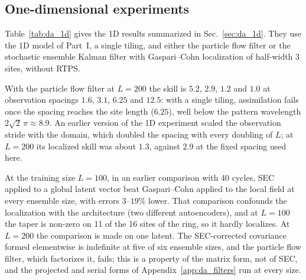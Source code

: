 \subsection{One-dimensional experiments}
\label{app:da_1d}

Table~\ref{tab:da_1d} gives the 1D results summarized in Sec.~\ref{sec:da_1d}. They use the 1D
model of Part~I, a single tiling, and either the particle flow filter or the stochastic ensemble
Kalman filter with Gaspari--Cohn localization of half-width 3 sites, without RTPS.

 With the particle flow filter at $L=200$ the skill is $5.2$, $2.9$, $1.2$ and
$1.0$ at observation spacings $1.6$, $3.1$, $6.25$ and $12.5$: with a single tiling, assimilation fails once
the spacing reaches the site length ($6.25$), well below the pattern wavelength $2\sqrt2\,\pi\approx8.9$.
An earlier version of the 1D experiment scaled the observation stride with the domain, which doubled
the spacing with every doubling of $L$; at $L=200$ its localized skill was about $1.3$, against $2.9$ at the
fixed spacing used here.

 At the training size $L=100$, in an earlier comparison with 40
cycles, SEC applied to a global latent vector beat Gaspari--Cohn applied to the local field at every
ensemble size, with errors $3$--$19\%$ lower. That comparison confounds the localization with the
architecture (two different autoencoders), and at $L=100$ the taper is non-zero on 11 of the 16 sites
of the ring, so it hardly localizes. At $L=200$ the comparison is made on one latent. The
SEC-corrected covariance formed elementwise is indefinite at five of six ensemble sizes, and the
particle flow filter, which factorizes it, fails; this is a property of the matrix form, not of SEC,
and the projected and serial forms of Appendix~\ref{app:da_filters} run at every size.

\begin{table}[htbp]
\caption{1D KS data assimilation after transfer: steady-state skill
(free-run error over analysis error, cycles 51--100) at a fixed
observation spacing of $3.125$, model trained at $L=100$. Pairs: no
localization / Gaspari--Cohn (half-width 3 sites). Last two columns
($L=200$ only): sampling error correction with the particle flow filter
after projection onto the PSD cone, and in a serial ensemble Kalman
filter. Skill below 1 means the filter is worse than no assimilation.}
\label{tab:da_1d}
\end{table}



